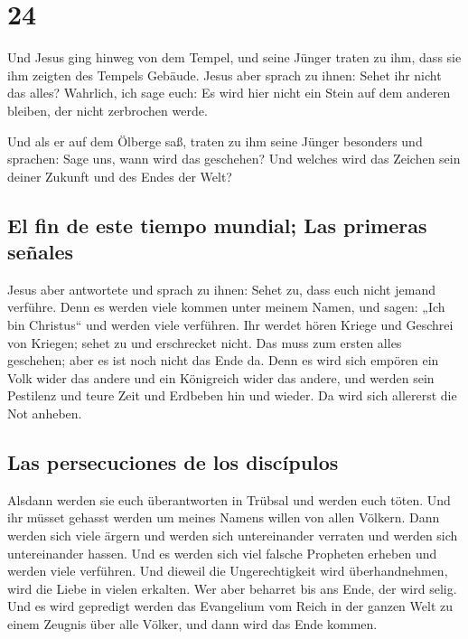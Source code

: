 \hypertarget{section-23}{%
\section{24}\label{section-23}}

 Und Jesus ging hinweg von dem Tempel, und seine Jünger
traten zu ihm, dass sie ihm zeigten des Tempels Gebäude. 
Jesus aber sprach zu ihnen: Sehet ihr nicht das alles? Wahrlich, ich
sage euch: Es wird hier nicht ein Stein auf dem anderen bleiben, der
nicht zerbrochen werde.

 Und als er auf dem Ölberge saß, traten zu ihm seine
Jünger besonders und sprachen: Sage uns, wann wird das geschehen? Und
welches wird das Zeichen sein deiner Zukunft und des Endes der Welt?

\hypertarget{el-fin-de-este-tiempo-mundial-las-primeras-seuxf1ales}{%
\subsection{El fin de este tiempo mundial; Las primeras
señales}\label{el-fin-de-este-tiempo-mundial-las-primeras-seuxf1ales}}

 Jesus aber antwortete und sprach zu ihnen: Sehet zu, dass
euch nicht jemand verführe.  Denn es werden viele kommen
unter meinem Namen, und sagen: „Ich bin Christus`` und werden viele
verführen.  Ihr werdet hören Kriege und Geschrei von
Kriegen; sehet zu und erschrecket nicht. Das muss zum ersten alles
geschehen; aber es ist noch nicht das Ende da.  Denn es
wird sich empören ein Volk wider das andere und ein Königreich wider das
andere, und werden sein Pestilenz und teure Zeit und Erdbeben hin und
wieder.  Da wird sich allererst die Not anheben.

\hypertarget{las-persecuciones-de-los-discuxedpulos}{%
\subsection{Las persecuciones de los
discípulos}\label{las-persecuciones-de-los-discuxedpulos}}

 Alsdann werden sie euch überantworten in Trübsal und
werden euch töten. Und ihr müsset gehasst werden um meines Namens willen
von allen Völkern.  Dann werden sich viele ärgern und
werden sich untereinander verraten und werden sich untereinander hassen.
 Und es werden sich viel falsche Propheten erheben und
werden viele verführen.  Und dieweil die Ungerechtigkeit
wird überhandnehmen, wird die Liebe in vielen erkalten. 
Wer aber beharret bis ans Ende, der wird selig.  Und es
wird gepredigt werden das Evangelium vom Reich in der ganzen Welt zu
einem Zeugnis über alle Völker, und dann wird das Ende kommen.

